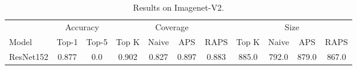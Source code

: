 \begin{table}[t]
\centering
\small
\begin{tabular}{lcccccccccc}
\toprule
 & \multicolumn{2}{c}{Accuracy}  & \multicolumn{4}{c}{Coverage} & \multicolumn{4}{c}{Size} \\ 
\cmidrule(r){2-3}  \cmidrule(r){4-7}  \cmidrule(r){8-11}
Model & Top-1 & Top-5 & Top K & Naive & APS & RAPS & Top K & Naive & APS & RAPS \\ 
\midrule
 ResNet152 &  0.877 &  0.0 & 0.902 & 0.827 & 0.897 & 0.883 & 885.0 & 792.0 & 879.0 & 867.0 \\ 
\bottomrule
\end{tabular}
\caption{Results on Imagenet-V2.} 
\label{table:imagenet-v2}
\end{table}
